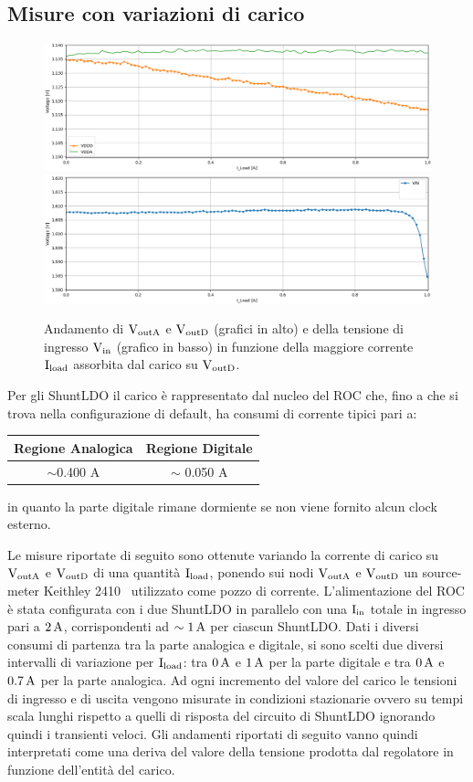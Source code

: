 \subsection{Misure con variazioni di carico}
\label{451}
\begin{figure}
\centering
\includegraphics[width=\textwidth]{Immagini/LoadVDDD}
\includegraphics[width=\textwidth]{Immagini/LoadVIND}
\caption{Andamento di $\mathrm{V_{outA}}$ e $\mathrm{V_{outD}}$ (grafici in alto) e della tensione di ingresso $\mathrm{V_{in}}$ (grafico in basso) in funzione della maggiore corrente $\mathrm{I_{load}}$ assorbita dal carico su $\mathrm{V_{outD}}$.}
\label{LoadVDDD}
\label{LoadVIND}
\end{figure}

Per gli ShuntLDO il carico è rappresentato dal nucleo del ROC che, fino a che si trova nella configurazione di default, ha consumi di corrente tipici pari a:
\begin{center}
\begin{tabular}{cc}
\hline
Regione Analogica & Regione Digitale \\ \hline
$\sim$0.400 A & $\sim$ 0.050 A\\ \hline     
\end{tabular}
\end{center}
in quanto la parte digitale rimane dormiente se non viene fornito alcun clock esterno.

Le misure riportate di seguito sono ottenute variando la corrente di carico su $\mathrm{V_{outA}}$ e $\mathrm{V_{outD}}$ di una quantit\`a $\mathrm{I_{load}}$, ponendo sui nodi $\mathrm{V_{outA}}$ e $\mathrm{V_{outD}}$ un source-meter Keithley 2410~\cite{2410} utilizzato come pozzo di corrente. L'alimentazione del ROC \`e stata configurata con i due ShuntLDO in parallelo con una $\mathrm{I_{in}}$ totale in ingresso pari a $2\rm \, A$, corrispondenti ad $\sim 1\rm \, A$ per ciascun ShuntLDO. Dati i diversi consumi di partenza tra la parte analogica e digitale, si sono scelti due diversi intervalli di variazione per $\mathrm{I_{load}}$: tra $0\rm \, A$ e $1\rm \, A$ per la parte digitale e tra $0\rm \, A$ e $0.7\rm \, A$ per la parte analogica. Ad ogni incremento del valore del carico le tensioni di ingresso e di uscita vengono misurate in condizioni stazionarie ovvero su tempi scala lunghi rispetto a quelli di risposta del circuito di ShuntLDO ignorando quindi i transienti veloci.
Gli andamenti riportati di seguito vanno quindi interpretati come una deriva del valore della tensione prodotta dal regolatore in funzione dell'entità del carico. 

